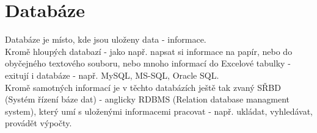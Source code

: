 \section{Databáze}
Databáze je místo, kde jsou uloženy data - informace.\\
Kromě hloupých databazí - jako např. napsat si informace na papír, nebo do obyčejného textového souboru, nebo mnoho informací do Excelové tabulky - exitují i  databáze - např. MySQL, MS-SQL, Oracle SQL.\\
Kromě samotných informací je v těchto databázích ještě tak zvaný SŘBD (Systém řízení báze dat) - anglicky RDBMS (Relation database managment system), který umí s uloženými informacemi pracovat - např. ukládat, vyhledávat, provádět výpočty.